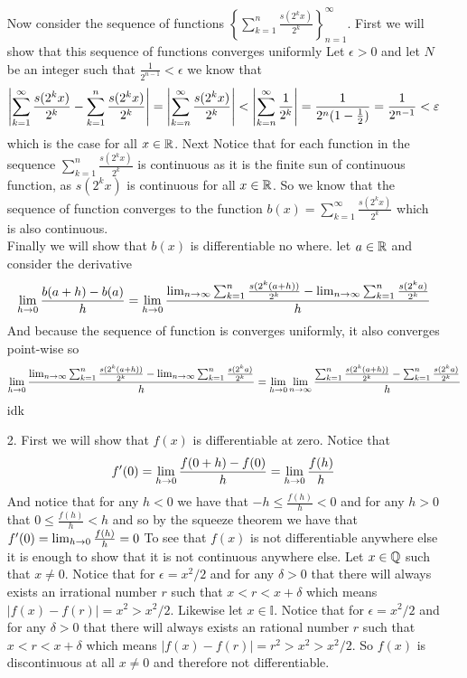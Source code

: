 \documentclass[12pt]{amsart}
\begin{document}
\begin{itemize}
     Now consider the sequence of functions $\displaystyle{\left\{\sum_{k=1}^n\frac{s(2^kx)}{2^k}\right\}_{n=1}^{\infty}}$. 
     First we will show that this sequence of functions converges uniformly
     Let $\epsilon>0$ and let $N$ be an integer such that $\frac{1}{2^{n-1}}<\epsilon$ we know that 
     \[\left\vert \sum_{k=1}^\infty\frac{s(2^kx)}{2^k}-\sum_{k=1}^n\frac{s(2^kx)}{2^k} \right\vert=\left\vert \sum_{k=n}^\infty\frac{s(2^kx)}{2^k} \right\vert<\left\vert \sum_{k=n}^\infty\frac{1}{2^k} \right\vert=\frac{1}{2^n(1-\frac{1}{2})}=\frac{1}{2^{n-1}}<\varepsilon\]
     which is the case for all $x\in\mathbb{R}$. 
     Next Notice that for each function in the sequence
     $\sum_{k=1}^n\frac{s(2^kx)}{2^k}$ is continuous as it is the finite sun of continuous function, as $s(2^kx)$ is continuous for all $x\in\mathbb{R}$.
     So we know that the sequence of function converges to the function $b(x)=\sum_{k=1}^\infty\frac{s(2^kx)}{2^k}$ which is also continuous.\\

     Finally we will show that $b(x)$ is differentiable no where. let $a\in\mathbb{R}$ and consider the derivative
     \[\lim_{h\rightarrow 0}\frac{b(a+h)-b(a)}{h}=\lim_{h\rightarrow 0}\frac{\lim_{n\rightarrow\infty}\sum_{k=1}^n\frac{s(2^k(a+h))}{2^k}-\lim_{n\rightarrow\infty}\sum_{k=1}^n\frac{s(2^ka)}{2^k}}{h}\]
     And because the sequence of function is converges uniformly, it also converges point-wise so
     \[\lim_{h\rightarrow 0}\frac{\lim_{n\rightarrow\infty}\sum_{k=1}^n\frac{s(2^k(a+h))}{2^k}-\lim_{n\rightarrow\infty}\sum_{k=1}^n\frac{s(2^ka)}{2^k}}{h}=\lim_{h\rightarrow 0}\lim_{n\rightarrow\infty}\frac{\sum_{k=1}^n\frac{s(2^k(a+h))}{2^k}-\sum_{k=1}^n\frac{s(2^ka)}{2^k}}{h}\]
     idk

     \item[2.] First we will show that $f(x)$ is differentiable at zero. Notice that
     \[f'(0)=\lim_{h\rightarrow 0}\frac{f(0+h)-f(0)}{h}=\lim_{h\rightarrow 0}\frac{f(h)}{h}\]
     And notice that for any $h<0$ we have that $-h\leq \frac{f(h)}{h}<0$ and for any $h>0$ that $0\leq \frac{f(h)}{h}<h$ 
     and so by the squeeze theorem we have that \(f'(0)=\lim_{h\rightarrow 0}\frac{f(h)}{h}=0\)
     To see that $f(x)$ is not differentiable anywhere else it is enough to show that it is not continuous anywhere else. 
     Let $x\in \mathbb{Q}$ such that $x\neq 0$. Notice that for $\epsilon=x^2/2$ and for any $\delta>0$ that there will always exists an irrational 
     number $r$ such that $x<r<x+\delta$ which means $|f(x)-f(r)|=x^2>x^2/2$. Likewise let $x\in \mathbb{I}$. Notice that for $\epsilon=x^2/2$ and for any 
     $\delta>0$ that there will always exists an rational number $r$ such that $x<r<x+\delta$ which means $|f(x)-f(r)|=r^2>x^2>x^2/2$. 
     So $f(x)$ is discontinuous at all $x\neq 0$ and therefore not differentiable.


\end{itemize}
\end{document}
